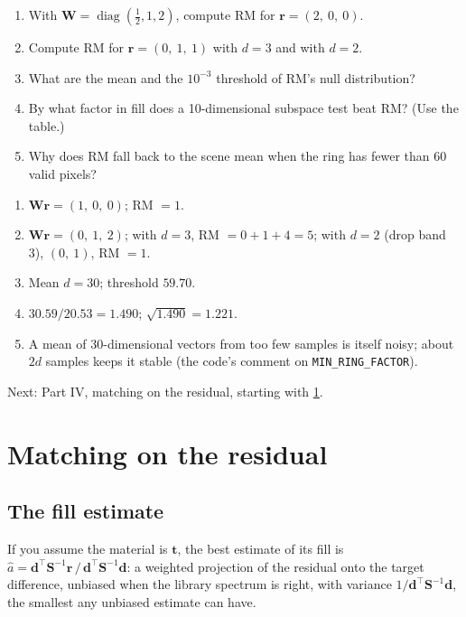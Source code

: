 \documentclass[11pt,a4paper,oneside,openany]{book}
\newcommand{\B}[1]{{\symbf{#1}}}
\newcommand{\B}[1]{{\bm{#1}}}
\newcommand{\T}{^{\top}}
\newcommand{\vt}{\B{t}}
\newcommand{\vr}{\B{r}}
\newcommand{\vd}{\B{d}}
\newcommand{\mS}{\B{S}}
\newcommand{\mW}{\B{W}}
\newcommand{\ahat}{\hat a}
\newcommand{\nextchapter}[1]{\par\medskip\noindent\hfill\textsf{\small Next: #1}\par}
\begin{document}
\begin{checkyourself}
\begin{enumerate}
\item With $\mW=\operatorname{diag}(\frac12,1,2)$, compute RM for $\vr=(2,\ 0,\ 0)$.
\item Compute RM for $\vr=(0,\ 1,\ 1)$ with $d=3$ and with $d=2$.
\item What are the mean and the $10^{-3}$ threshold of RM's null distribution?
\item By what factor in fill does a 10-dimensional subspace test beat RM? (Use the table.)
\item Why does RM fall back to the scene mean when the ring has fewer than 60 valid pixels?
\end{enumerate}
\end{checkyourself}

\begin{answers}
\begin{enumerate}
\item $\mW\vr=(1,\ 0,\ 0)$; RM $=1$.
\item $\mW\vr=(0,\ 1,\ 2)$; with $d=3$, RM $=0+1+4=5$; with $d=2$ (drop band 3), $(0,\ 1)$, RM $=1$.
\item Mean $d=30$; threshold $59.70$.
\item $30.59/20.53=1.490$; $\sqrt{1.490}=1.221$.
\item A mean of 30-dimensional vectors from too few samples is itself noisy; about $2d$ samples keeps it stable (the code's comment on
  \texttt{MIN\_RING\_FACTOR}).
\end{enumerate}
\end{answers}

\nextchapter{Part IV, matching on the residual, starting with \cref{ch:fill}.}
\part{Matching on the residual}
\label{part:matching}

\chapter{The fill estimate}
\label{ch:fill}

\begin{onething}
If you assume the material is $\vt$, the best estimate of its fill is $\ahat=\vd\T\mS^{-1}\vr\,/\,\vd\T\mS^{-1}\vd$: a weighted projection
of the residual onto the target difference, unbiased when the library spectrum is right, with variance $1/\vd\T\mS^{-1}\vd$, the
smallest any unbiased estimate can have.
\end{onething}
\end{document}
